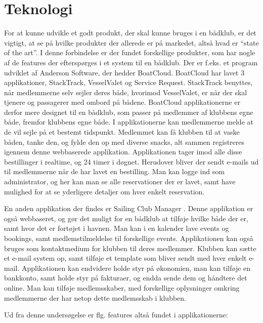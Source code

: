 \chapter{Teknologi}\label{chap:teknologi-analyse}



For at kunne udvikle et godt produkt, der skal kunne bruges i en bådklub, er det vigtigt, at se på hvilke
produkter der allerede er på markedet, altså hvad er ``state of the art''. I denne forbindelse er der fundet
forskellige produkter, som har nogle af de features der efterspørges i et system til en bådklub. Der er f.eks.
et program udviklet af Anderson Software, der hedder BoatCloud.\citep{BoatCloud} BoatCloud har lavet 3
applikationer, StackTrack, VesselValet og Service Request. StackTrack benyttes, når medlemmerne selv sejler
deres både, hvorimod VesselValet, er når der skal tjenere og passagerer med ombord på bådene. BoatCloud
applikationerne er derfor mere designet til en bådklub, som passer på medlemmer af klubbens egne både, fremfor
klubbens egne både. I applikationerne kan medlemmerne melde at de vil sejle på et bestemt tidspunkt. Medlemmet
kan få klubben til at vaske båden, tanke den, og fylde den op med diverse snacks, alt sammen registreres
igennem denne webbaserede applikation. Applikationen tager imod alle disse bestillinger i realtime, og 24
timer i døgnet. Herudover bliver der sendt e-mails ud til medlemmerne når de har lavet en bestilling. Man kan
logge ind som administrator, og her kan man se alle reservationer der er lavet, samt have mulighed for at
se yderligere detaljer om hver enkelt reservation.

En anden applikation der findes er Sailing Club Manager \citep{SailClub}. Denne applikation er også
webbaseret, og gør det muligt for en bådklub at tilføje hvilke både der er, samt hvor det er fortøjet i
havnen. Man kan i en kalender lave events og bookings, samt medlemstilmeldelse til forskellige events. Applikationen kan også bruges som kontaktmedium for klubben til deres medlemmer. Klubben kan sætte et
e-mail system op, samt tilføje et template som bliver sendt med hver enkelt e-mail. Applikationen kan endvidere
holde styr på økonomien, man kan tilføje en bankkonto, samt  holde styr på fakturaer, og endda sende
dem og håndtere det online. Man kan tilføje medlemsskaber, med forskellige oplysninger omkring medlemmerne der
har netop dette medlemsskab i klubben.

Ud fra denne undersøgelse er flg. features altså fundet i applikationerne:

